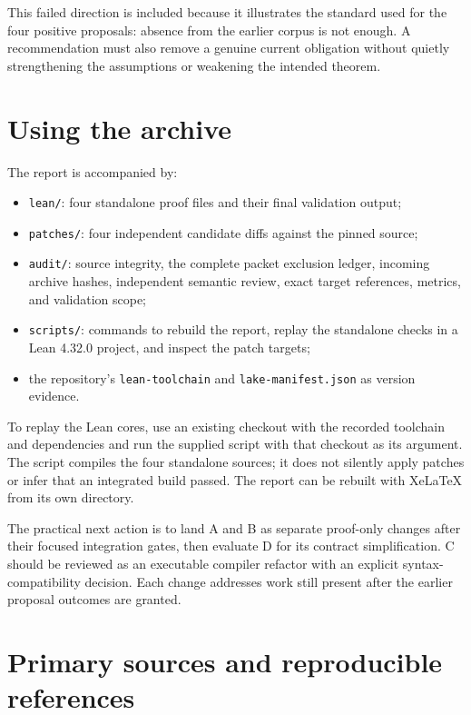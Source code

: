 \documentclass[11pt,letterpaper]{article}
\newcommand{\code}[1]{{\small\nolinkurl{#1}}}
\begin{document}
This failed direction is included because it illustrates the standard used for the four positive proposals: absence from the earlier corpus is not enough. A recommendation must also remove a genuine current obligation without quietly strengthening the assumptions or weakening the intended theorem.

\section{Using the archive}

The report is accompanied by:

\begin{itemize}
\item \code{lean/}: four standalone proof files and their final validation output;
\item \code{patches/}: four independent candidate diffs against the pinned source;
\item \code{audit/}: source integrity, the complete packet exclusion ledger, incoming archive hashes, independent semantic review, exact target references, metrics, and validation scope;
\item \code{scripts/}: commands to rebuild the report, replay the standalone checks in a Lean 4.32.0 project, and inspect the patch targets;
\item the repository's \code{lean-toolchain} and \code{lake-manifest.json} as version evidence.
\end{itemize}

To replay the Lean cores, use an existing checkout with the recorded toolchain and dependencies and run the supplied script with that checkout as its argument. The script compiles the four standalone sources; it does not silently apply patches or infer that an integrated build passed. The report can be rebuilt with XeLaTeX from its own directory.

The practical next action is to land A and B as separate proof-only changes after their focused integration gates, then evaluate D for its contract simplification. C should be reviewed as an executable compiler refactor with an explicit syntax-compatibility decision. Each change addresses work still present after the earlier proposal outcomes are granted.

\appendix
\section{Primary sources and reproducible references}
\end{document}
